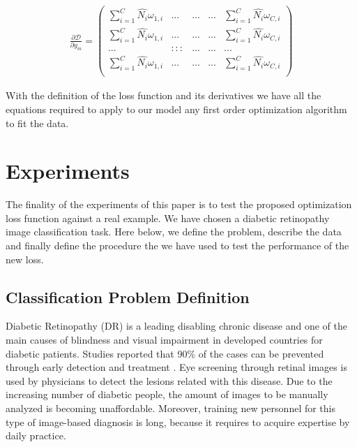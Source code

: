 \documentclass[times,twocolumn,final,authoryear]{elsarticle}
\begin{document}
\begin{equation}
\begin{aligned}
\frac{\partial \mathcal{D}}{\partial y_m} =
\begin{pmatrix} 
\sum_{i=1}^C \hat{N_i} \omega_{1,i} & ...  & ...     & ... & \sum_{i=1}^C \hat{N_i} \omega_{C,i}\\
\sum_{i=1}^C \hat{N_i} \omega_{1,i} & ...  & ...     & ... & \sum_{i=1}^C \hat{N_i} \omega_{C,i}\\
... & ::: & ... & ... & ...\\
\sum_{i=1}^C \hat{N_i} \omega_{1,i} & ...  & ...     & ... & \sum_{i=1}^C \hat{N_i} \omega_{C,i}\\ 
\end{pmatrix}
\end{aligned}
\end{equation}

With the definition of the loss function and its derivatives we have all the equations required to apply to our model any first order optimization algorithm to fit the data. 

\section{Experiments}

The finality of the experiments of this paper is to test the proposed optimization loss function against a real example. We have chosen a diabetic retinopathy image classification task. Here below, we define the problem, describe the data and finally define the procedure the we have used to test the performance of the new loss.

\subsection{Classification Problem Definition}

Diabetic Retinopathy (DR) is a leading disabling chronic disease  and  one of the main causes of blindness and visual impairment in developed countries for diabetic patients. Studies reported that 90\% of the cases can be prevented through early detection and treatment \cite{torrents15}. Eye screening through retinal images is used by physicians to detect the lesions related with this disease. Due to the increasing number of diabetic people, the amount of images to be manually analyzed is becoming unaffordable. Moreover, training new personnel for this type of image-based diagnosis is long, because it requires to acquire expertise by daily practice. 
\end{document}
